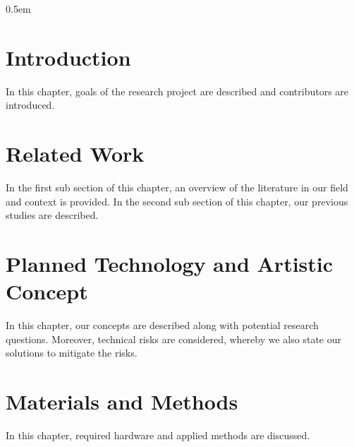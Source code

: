 \documentclass[11pt,a4paper,titlepage,final,table]{article}
\begin{document}
\maketitle
\clearpage
{}
\setcounter{page}{2}
\pagestyle{plain}
\parskip 0.5em





{}

\lstset{
	basicstyle=\ttfamily\small,
	keywordstyle=\bfseries,
	language=[Sharp]C
}



\section{Introduction}
In this chapter, goals of the research project are described and contributors are introduced.



\section{Related Work}
In the first sub section of this chapter, an overview of the literature in our field and context is provided.
In the second sub section of this chapter, our previous studies are described.



\section{Planned Technology and Artistic Concept}
In this chapter, our concepts are described along with potential research questions.
Moreover, technical risks are considered, whereby we also state our solutions to mitigate the risks.






\section{Materials and Methods}
In this chapter, required hardware and applied methods are discussed.


\end{document}
